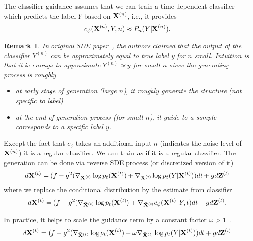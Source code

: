 \documentclass[11pt]{article}
\newtheorem{remark}{Remark}
\begin{document}
The classifier guidance assumes that we can train a time-dependent classifier which predicts the label $Y$ based on ${\bf X}^{(n)}$, i.e., it provides
\begin{align}
    c_{\phi}({\bf X}^{(n)}, Y, n) \approx P_n(Y|{\bf X}^{(n)}).
\end{align}

\begin{remark}
    In original SDE paper~\cite{song2021scorebased},
    the authors claimed that the output of the classifier $Y^{(n)}$ can be approximately equal to true label $y$ for $n$ small.
    Intuition is that it is enough to approximate $Y^{(n)}\approx y$ for small $n$ since the generating process is roughly
    \begin{itemize}
        \item at early stage of generation (large $n$), it roughly generate the structure (not specific to label)
        \item at the end of generation process (for small $n$), it guide to a sample corresponds to a specific label $y$.
    \end{itemize}
    
\end{remark}

Except the fact that $c_\phi$ takes an additional input $n$ (indicates the noise level of ${\bf X}^{(n)}$) it is a regular classifier.
We can train as if it is a regular classifier.
The generation can be done via reverse SDE process (or discretized version of it)
\begin{align}
    d\bar{{\bf X}}^{(t)} = (f - g^2 (\nabla_{\bar{{\bf X}}^{(t)}} \log p_t (\bar{{\bf X}}^{(t)}) + \nabla_{\bar{{\bf X}}^{(t)}} \log p_t (Y|\bar{{\bf X}}^{(t)}))dt + g d\bar{{\bf Z}}^{(t)}
\end{align}
where we replace the conditional distribution by the estimate from classifier
\begin{align}
    d\bar{{\bf X}}^{(t)} = (f - g^2 (\nabla_{\bar{{\bf X}}^{(t)}} \log p_t (\bar{{\bf X}}^{(t)}) + \nabla_{\bar{{\bf X}}^{(t)}} c_\phi ({\bf X}^{(t)}, Y, t) dt + g d\bar{{\bf Z}}^{(t)}.
\end{align}

In practice, it helps to scale the guidance term by a constant factor $\omega>1$~\cite{dhariwal2021diffusion}.
\begin{align}
    d\bar{{\bf X}}^{(t)} = (f - g^2 (\nabla_{\bar{{\bf X}}^{(t)}} \log p_t (\bar{{\bf X}}^{(t)}) 
    + \omega \nabla_{\bar{{\bf X}}^{(t)}} \log p_t (Y|\bar{{\bf X}}^{(t)}))dt + g d\bar{{\bf Z}}^{(t)}
\end{align}
\end{document}
